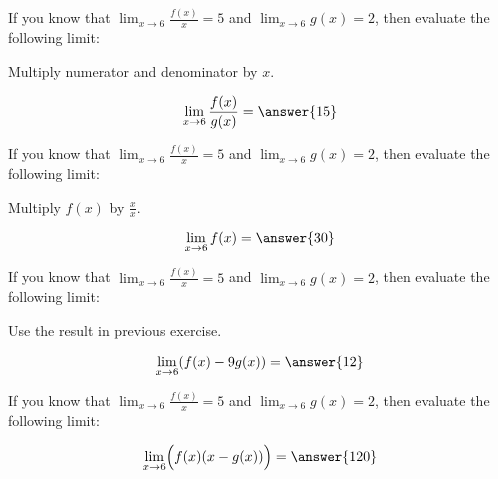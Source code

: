 \documentclass{ximera}
\author{Steven Gubkin\and Nela Lakos}
\begin{document}
\begin{exercise}

	If you know that $\lim_{x \to 6} \frac{f(x)}{x} = 5$ and $\lim_{x \to 6} g(x) = 2$, then evaluate the following limit:
	
	\begin{hint}
		Multiply numerator and denominator by $x$.
	\end{hint}
	
	\[
		\lim_{x \to 6} \frac{f(x)}{g(x)} = \answer{15}
	\]
	
\end{exercise}

\begin{exercise}

	If you know that $\lim_{x \to 6} \frac{f(x)}{x} = 5$ and $\lim_{x \to 6} g(x) = 2$, then evaluate the following limit:
	
	\begin{hint}
		Multiply $f(x)$ by $\frac{x}{x}$.
	\end{hint}
	
	\[
		\lim_{x \to 6} f(x) = \answer{30}
	\]
	\end{exercise}
	\begin{exercise}

	If you know that $\lim_{x \to 6} \frac{f(x)}{x} = 5$ and $\lim_{x \to 6} g(x) = 2$, then evaluate the following limit:
	
	\begin{hint}
		Use the result in previous exercise.
	\end{hint}
	
	\[
		\lim_{x \to 6} (f(x)-9g(x)) = \answer{12}
	\]

\end{exercise}
\begin{exercise}

	If you know that $\lim_{x \to 6} \frac{f(x)}{x} = 5$ and $\lim_{x \to 6} g(x) = 2$, then evaluate the following limit:
	
	\[
		\lim_{x \to 6} \Bigl(f(x)(x-g(x))\Bigr) = \answer{120}
	\]

\end{exercise}
\end{document}
